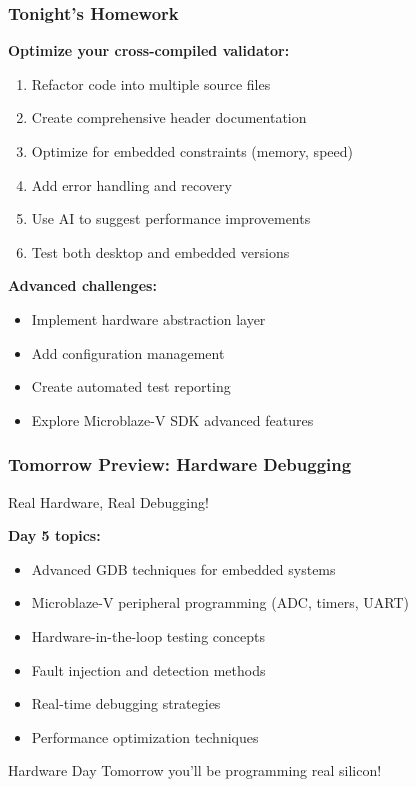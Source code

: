 \documentclass{beamer}
\begin{document}
\begin{frame}
\frametitle{Tonight's Homework}
\textbf{Optimize your cross-compiled validator:}
\begin{enumerate}
    \item Refactor code into multiple source files
    \item Create comprehensive header documentation
    \item Optimize for embedded constraints (memory, speed)
    \item Add error handling and recovery
    \item Use AI to suggest performance improvements
    \item Test both desktop and embedded versions
\end{enumerate}

\vspace{0.5cm}
\textbf{Advanced challenges:}
\begin{itemize}
    \item Implement hardware abstraction layer
    \item Add configuration management
    \item Create automated test reporting
    \item Explore Microblaze-V SDK advanced features
\end{itemize}
\end{frame}

\begin{frame}
\frametitle{Tomorrow Preview: Hardware Debugging}
\begin{center}
\Large Real Hardware, Real Debugging!
\end{center}

\textbf{Day 5 topics:}
\begin{itemize}
    \item Advanced GDB techniques for embedded systems
    \item Microblaze-V peripheral programming (ADC, timers, UART)
    \item Hardware-in-the-loop testing concepts
    \item Fault injection and detection methods
    \item Real-time debugging strategies
    \item Performance optimization techniques
\end{itemize}

\vspace{0.5cm}
\begin{alertblock}{Hardware Day}
Tomorrow you'll be programming real silicon!
\end{alertblock}
\end{frame}
\end{document}
